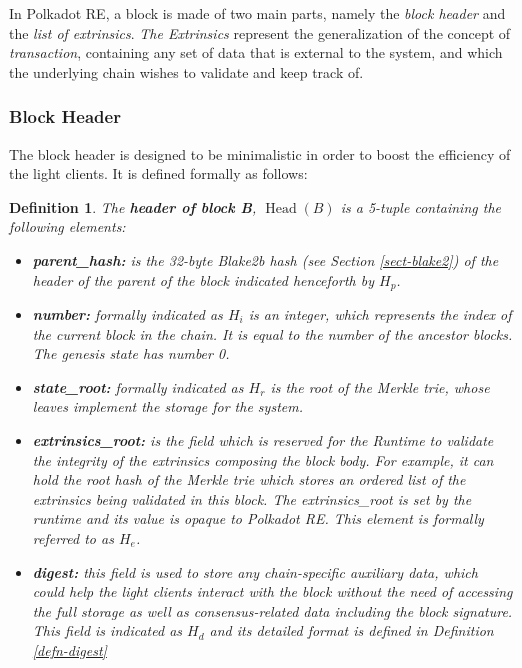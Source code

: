 \documentclass{book}
\newcommand{\tmem}[1]{{\em #1\/}}
\newcommand{\tmop}[1]{\ensuremath{\operatorname{#1}}}
\newcommand{\tmsamp}[1]{\textsf{#1}}
\newcommand{\tmstrong}[1]{\textbf{#1}}
\newcommand{\tmtextbf}[1]{{\bfseries{#1}}}
\newcommand{\tmtextit}[1]{{\itshape{#1}}}
\newcommand{\tmtextsf}[1]{{\sffamily{#1}}}
\newtheorem{definition}{Definition}
\providecommand{\tmem}[1]{\tmtextit{#1}}
\providecommand{\tmop}[1]{\ensuremath{\mathrm{#1}}}
\providecommand{\tmsamp}[1]{\tmtextsf{#1}}
\providecommand{\tmstrong}[1]{\tmtextbf{#1}}
\providecommand{\tmtextbf}[1]{\tmtextbf{#1}}
\providecommand{\tmtextit}[1]{\tmtextit{#1}}
\newtheorem{definition}{Definition}
\begin{document}
In Polkadot RE, a block is made of two main parts, namely the \tmtextit{block
header} and the \tmtextit{list of extrinsics}. {\tmem{The Extrinsics}}
represent the generalization of the concept of {\tmem{transaction}},
containing any set of data that is external to the system, and which the
underlying chain wishes to validate and keep track of.

\subsubsection{Block Header}\label{block}

The block header is designed to be minimalistic in order to boost the
efficiency of the light clients. It is defined formally as follows:

\begin{definition}
  \label{defn-block-header}The {\tmstrong{header of block B}},
  {\tmstrong{$\tmop{Head} (B)$}} is a 5-tuple containing the following
  elements:
  \begin{itemize}
    \item \tmtextbf{{\tmsamp{parent\_hash:}}} is the 32-byte Blake2b hash (see
    Section \ref{sect-blake2}) of the header of the parent of the block
    indicated henceforth by \tmtextbf{$H_p$}.
    
    \item {\tmstrong{{\tmsamp{number:}}}} formally indicated as
    {\tmstrong{$H_i$}} is an integer, which represents the index of the
    current block in the chain. It is equal to the number of the ancestor
    blocks. The genesis state has number 0.
    
    \item {\tmstrong{{\tmsamp{state\_root:}}}} formally indicated as
    {\tmstrong{$H_r$}} is the root of the Merkle trie, whose leaves implement
    the storage for the system.
    
    \item {\tmstrong{{\tmsamp{extrinsics\_root:}}}} is the field which is
    reserved for the Runtime to validate the integrity of the extrinsics
    composing the block body. For example, it can hold the root hash of the
    Merkle trie which stores an ordered list of the extrinsics being validated
    in this block. The {\tmsamp{extrinsics\_root}} is set by the runtime and
    its value is opaque to Polkadot RE. This element is formally referred to
    as {\tmstrong{$H_e$}}.
    
    \item {\tmstrong{{\tmsamp{digest:}}}} this field is used to store any
    chain-specific auxiliary data, which could help the light clients interact
    with the block without the need of accessing the full storage as well as
    consensus-related data including the block signature. This field is
    indicated as {\tmstrong{$H_d$}} and its detailed format is defined in
    Definition \ref{defn-digest}
  \end{itemize}
\end{definition}
\end{document}
